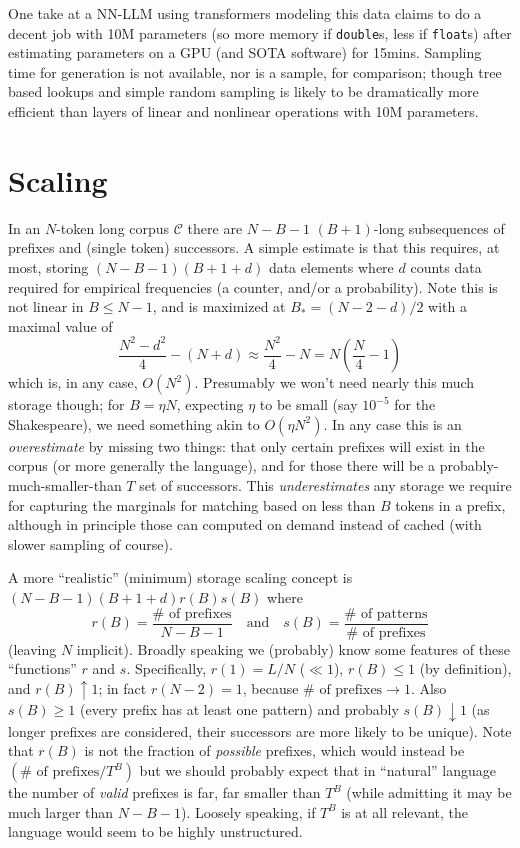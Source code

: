 \documentclass[11pt, oneside]{amsart}   	%
\begin{document}
One take at a NN-LLM using transformers modeling this data claims to do a decent job with 10M parameters (so more memory if \texttt{double}s, less if \texttt{float}s) after estimating parameters on a GPU (and SOTA software) for 15mins. Sampling time for generation is not available, nor is a sample, for comparison; though tree based lookups and simple random sampling is likely to be dramatically more efficient than layers of linear and nonlinear operations with 10M parameters. 

\section{Scaling}

In an $N$-token long corpus $\mathcal{C}$ there are $N-B-1$ $(B+1)$-long subsequences of prefixes and (single token) successors. A simple estimate is that this requires, at most, storing $(N-B-1)(B+1+d)$ data elements where $d$ counts data required for empirical frequencies (a counter, and/or a probability). Note this is not linear in $B \leq N-1$, and is maximized at $B_* = (N-2-d)/2$ with a maximal value of
\begin{equation*}
	\frac{N^2-d^2}{4} - (N+d)
		\approx \frac{N^2}{4} - N = N\left( \frac{N}{4} - 1 \right)
\end{equation*}
which is, in any case, $O(N^2)$. Presumably we won't need nearly this much storage though; for $B = \eta N$, expecting $\eta$ to be small (say $10^{-5}$ for the Shakespeare), we need something akin to $O(\eta N^2)$. In any case this is an {\em overestimate} by missing two things: that only certain prefixes will exist in the corpus (or more generally the language), and for those there will be a probably-much-smaller-than $T$ set of successors. This {\em underestimates} any storage we require for capturing the marginals for matching based on less than $B$ tokens in a prefix, although in principle those can computed on demand instead of cached (with slower sampling of course). 

A more ``realistic'' (minimum) storage scaling concept is $(N-B-1)(B+1+d)r(B)s(B)$ where
\begin{equation*}
	r(B) = \frac{\#\text{ of prefixes}}{N-B-1}
	\quad\text{and}\quad
	s(B) = \frac{\#\text{ of patterns}}{\#\text{ of prefixes}}
\end{equation*}
(leaving $N$ implicit). Broadly speaking we (probably) know some features of these ``functions'' $r$ and $s$. Specifically, $r(1) = L/N$ ($\ll 1$), $r(B) \leq 1$ (by definition), and $r(B) \uparrow 1$; in fact $r(N-2) = 1$, because $\#\text{ of prefixes} \to 1$. Also $s(B) \geq 1$ (every prefix has at least one pattern) and probably $s(B) \downarrow 1$ (as longer prefixes are considered, their successors are more likely to be unique). Note that $r(B)$ is not the fraction of {\em possible} prefixes, which would instead be $(\#\text{ of prefixes}/T^B)$ but we should probably expect that in ``natural'' language the number of {\em valid} prefixes is far, far smaller than $T^B$ (while admitting it may be much larger than $N-B-1$). Loosely speaking, if $T^B$ is at all relevant, the language would seem to be highly unstructured. 
\end{document}
